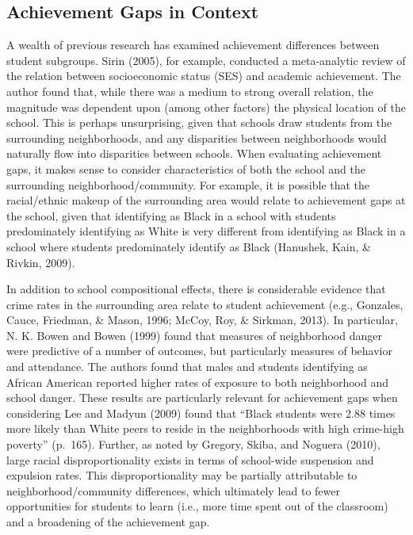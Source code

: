 \documentclass[man, fleqn, noextraspace]{apa6}
\theoremstyle{definition}
\theoremstyle{definition}
\theoremstyle{definition}
\theoremstyle{remark}
\begin{document}
\hypertarget{achievement-gaps-in-context}{%
\subsection{Achievement Gaps in
Context}\label{achievement-gaps-in-context}}

A wealth of previous research has examined achievement differences
between student subgroups. Sirin (2005), for example, conducted a
meta-analytic review of the relation between socioeconomic status (SES)
and academic achievement. The author found that, while there was a
medium to strong overall relation, the magnitude was dependent upon
(among other factors) the physical location of the school. This is
perhaps unsurprising, given that schools draw students from the
surrounding neighborhoods, and any disparities between neighborhoods
would naturally flow into disparities between schools. When evaluating
achievement gaps, it makes sense to consider characteristics of both the
school and the surrounding neighborhood/community. For example, it is
possible that the racial/ethnic makeup of the surrounding area would
relate to achievement gaps at the school, given that identifying as
Black in a school with students predominately identifying as White is
very different from identifying as Black in a school where students
predominately identify as Black (Hanushek, Kain, \& Rivkin, 2009).

In addition to school compositional effects, there is considerable
evidence that crime rates in the surrounding area relate to student
achievement (e.g., Gonzales, Cauce, Friedman, \& Mason, 1996; McCoy,
Roy, \& Sirkman, 2013). In particular, N. K. Bowen and Bowen (1999)
found that measures of neighborhood danger were predictive of a number
of outcomes, but particularly measures of behavior and attendance. The
authors found that males and students identifying as African American
reported higher rates of exposure to both neighborhood and school
danger. These results are particularly relevant for achievement gaps
when considering Lee and Madyun (2009) found that \enquote{Black
students were 2.88 times more likely than White peers to reside in the
neighborhoods with high crime-high poverty} (p.~165). Further, as noted
by Gregory, Skiba, and Noguera (2010), large racial disproportionality
exists in terms of school-wide suspension and expulsion rates. This
disproportionality may be partially attributable to
neighborhood/community differences, which ultimately lead to fewer
opportunities for students to learn (i.e., more time spent out of the
classroom) and a broadening of the achievement gap.
\end{document}
